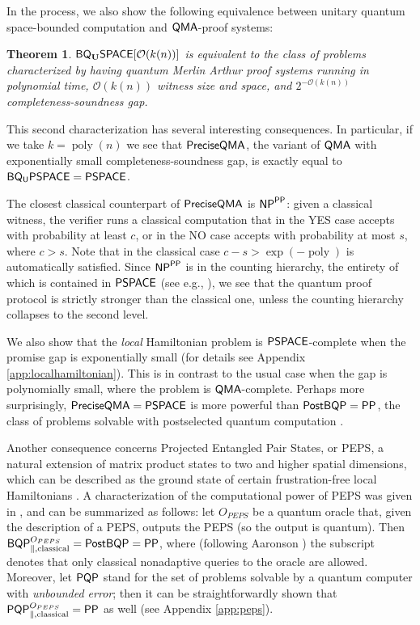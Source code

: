 \documentclass[11pt]{article}
\newtheorem{theorem}{Theorem}
\theoremstyle{definition}
\theoremstyle{remark}
\newcommand\QMA{{\sf{QMA}}}
\newcommand\PSPACE{{\sf{PSPACE}}}
\newcommand\BQPSPACE{{\sf{BQ_{U}PSPACE}}}
\newcommand\PP{\sf{PP}}
\newcommand\NP{{\sf{NP}}}
\newcommand\BQP{{\sf{BQP}}}
\newcommand\PostBQP{{\sf{PostBQP}}}
\newcommand\PQP{{\sf{PQP}}}
\newcommand\QMAexp{{\sf{PreciseQMA}}}
\newcommand{\classfont}{\sf}
\newcommand{\Unitary}{\mathbf{U}}
\newcommand{\unitaryBQSPACE}[1]{{\classfont{BQ}_\Unitary\classfont{SPACE}}[#1]}
\DeclareMathOperator{\poly}{poly}
\begin{document}
In the process, we also show the following equivalence between unitary quantum space-bounded computation and $\QMA$-proof systems:
\begin{theorem} \label{thm: equivalence}
$\unitaryBQSPACE{\mathcal{O}(k(n))}$ is equivalent to the class of problems characterized by having quantum Merlin Arthur proof systems running in polynomial time, $\mathcal{O}(k(n))$ witness size and space, and $2^{-\mathcal{O}(k(n))}$ completeness-soundness gap.
\end{theorem}

This second characterization has several interesting consequences.  In particular, if we take $k = \poly(n)$ we see that $\QMAexp$, the variant of $\QMA$ with exponentially small completeness-soundness gap, is exactly equal to $\BQPSPACE=\PSPACE$.  

The closest classical counterpart of $\QMAexp$ is $\NP^{\PP}$: given a classical witness, the verifier runs a classical computation that in the YES case accepts with probability at least $c$, or in the NO case accepts with probability at most $s$, where $c>s$. Note that in the classical case $c - s > \exp(-\poly)$ is automatically satisfied. Since $\NP^{\PP}$ is in the counting hierarchy, the entirety of which is contained in $\PSPACE$ (see e.g., \cite{allenderwagner}), we see that the quantum proof protocol is strictly stronger than the classical one, unless the counting hierarchy collapses to the second level.

We also show that the \emph{local} Hamiltonian problem is $\PSPACE$-complete when the promise gap is exponentially small (for details see Appendix \ref{app:localhamiltonian}). This is in contrast to the usual case when the gap is polynomially small, where the problem is $\QMA$-complete. Perhaps more surprisingly, $\QMAexp = \PSPACE$ is more powerful than $\PostBQP=\PP$, the class of problems solvable with postselected quantum computation \cite{aaronson05}.

Another consequence concerns Projected Entangled Pair States, or PEPS, a natural extension of matrix product states to two and higher spatial dimensions, which can be described as the ground state of certain frustration-free local Hamiltonians \cite{vc04}. A characterization of the computational power of PEPS was given in \cite{swv07}, and can be summarized as follows: let $O_{PEPS}$ be a quantum oracle that, given the description of a PEPS, outputs the PEPS (so the output is quantum). Then $\BQP^{O_{PEPS}}_{\parallel,\text{classical}} = \PostBQP = \PP$, where (following Aaronson \cite{aaronson05}) the subscript  denotes that only classical nonadaptive queries to the oracle are allowed. Moreover, let $\PQP$ stand for the set of problems solvable by a quantum computer with \emph{unbounded error}; then it can be straightforwardly shown that $\PQP^{O_{PEPS}}_{\parallel,\text{classical}} = \PP$ as well (see Appendix \ref{app:peps}).
\end{document}
